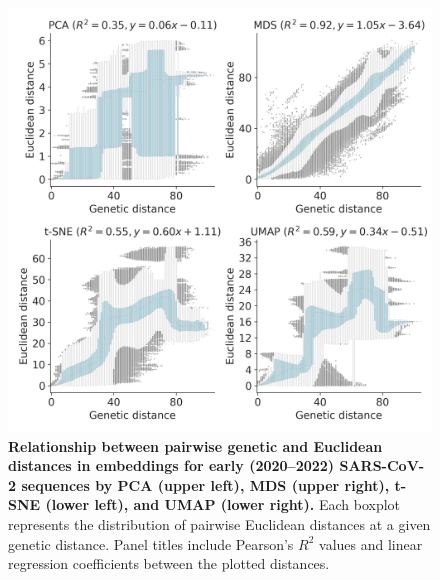 \documentclass[webpdf,contemporary,large,single]{oup-authoring-template}%
\theoremstyle{thmstyleone}%
\theoremstyle{thmstyletwo}%
\theoremstyle{thmstylethree}%
\begin{document}
\begin{figure}[!h]
\includegraphics[width=\columnwidth]{figures/sarscov2-euclidean-distance-by-genetic-distance.png}
\caption{{\bf Relationship between pairwise genetic and Euclidean distances in embeddings for early (2020--2022) SARS-CoV-2 sequences by PCA (upper left), MDS (upper right), t-SNE (lower left), and UMAP (lower right).}
  Each boxplot represents the distribution of pairwise Euclidean distances at a given genetic distance.
  Panel titles include Pearson's $R^{2}$ values and linear regression coefficients between the plotted distances.
}
\label{fig:sars-cov-2-pairwise-distances}
\end{figure}
\end{document}
